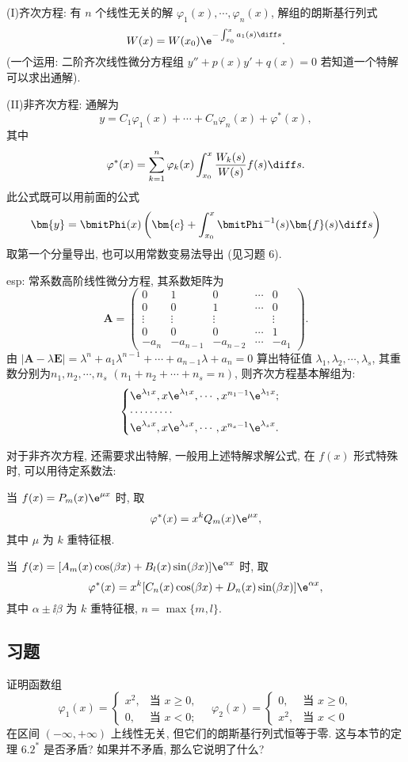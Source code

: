 (I)齐次方程: 有 $n$ 个线性无关的解 $\varphi_1(x),\cdots,\varphi_n(x)$, 解组的朗斯基行列式
\[W(x)=W(x_0)\e^{-\int_{x_0}^xa_1(s)\diff s}.\]
(一个运用: 二阶齐次线性微分方程组 $y''+p(x)y'+q(x)=0$ 若知道一个特解可以求出通解).

(II)非齐次方程: 通解为
\[y=C_1\varphi_1(x)+\cdots+C_n\varphi_n(x)+\varphi^*(x),\] 
其中
\[\varphi^*(x)=\sum_{k=1}^n\varphi_k(x)\int_{x_0}^x\frac{W_k(s)}{W(s)}f(s)\diff s.\] 
此公式既可以用前面的公式 
\[\bm{y}=\bmitPhi(x)\left(\bm{c}+\int_{x_0}^x\bmitPhi^{-1}(s)\bm{f}(s)\diff s\right)\]
取第一个分量导出, 也可以用常数变易法导出 (见习题 6).

esp: 常系数高阶线性微分方程, 其系数矩阵为
\[\bm{A} = 
  \begin{pmatrix}
    0 & 1 & 0 & \cdots & 0 \\
    0 & 0 & 1 & \cdots & 0 \\
    \vdots&\vdots&\vdots&&\vdots \\
    0 & 0 & 0 & \cdots & 1 \\
    -a_n&-a_{n-1}&-a_{n-2}&\cdots&-a_1
  \end{pmatrix}.\]
由 $|\bm{A}-\lambda\bm{E}|=\lambda^n+a_1\lambda^{n-1}+\cdots+a_{n-1}\lambda+a_n=0$
算出特征值 $\lambda_1,\lambda_2,\cdots,\lambda_s$, 其重数分别为$n_1,n_2,\cdots,n_s$
$(n_1+n_2+\cdots+n_s=n)$, 则齐次方程基本解组为:
\[\begin{cases}
\e^{\lambda_1x},x\e^{\lambda_1x},\cdots,x^{n_1-1}\e^{\lambda_1x};\\
\cdots\cdots\cdots\\
\e^{\lambda_sx},x\e^{\lambda_sx},\cdots,x^{n_s-1}\e^{\lambda_sx}.
\end{cases}\]

对于非齐次方程, 还需要求出特解, 一般用上述特解求解公式, 在 $f(x)$ 形式特殊时, 可以用待定系数法:

当 $f(x)=P_m(x)\e^{\mu x}$ 时, 取
\[\varphi^*(x)=x^kQ_m(x)\e^{\mu x},\]
其中 $\mu$ 为 $k$ 重特征根.

当 $f(x)=[A_m(x)\cos(\beta x)+B_l(x)\sin(\beta x)]\e^{\alpha x}$ 时, 取
\[\varphi^*(x)=x^k[C_n(x)\cos(\beta x)+D_n(x)\sin(\beta x)]\e^{\alpha x},\]
其中 $\alpha\pm\ii\beta$ 为 $k$ 重特征根, $n=\max\{m,l\}$.



\subsection{习题}



\begin{exercise}
  证明函数组
  \[\varphi_1(x) =
    \begin{cases}
      x^2, & \text{当\ } x\geq 0, \\
      0,   & \text{当\ } x<0;
    \end{cases}\quad
    \varphi_2(x)=
    \begin{cases}
      0,   & \text{当\ } x\geq 0, \\
      x^2, & \text{当\ } x<0
    \end{cases}\]
  在区间 $(-\infty,+\infty)$ 上线性无关, 但它们的朗斯基行列式恒等于零. 
  这与本节的定理 $6.2^*$ 是否矛盾? 如果并不矛盾, 那么它说明了什么?
\end{exercise}

